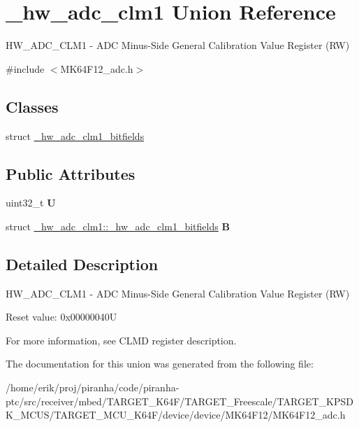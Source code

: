 \hypertarget{union__hw__adc__clm1}{}\section{\+\_\+hw\+\_\+adc\+\_\+clm1 Union Reference}
\label{union__hw__adc__clm1}


H\+W\+\_\+\+A\+D\+C\+\_\+\+C\+L\+M1 -\/ A\+DC Minus-\/\+Side General Calibration Value Register (RW)  




{\ttfamily \#include $<$M\+K64\+F12\+\_\+adc.\+h$>$}

\subsection*{Classes}
\begin{DoxyCompactItemize}
\item 
struct \hyperlink{struct__hw__adc__clm1_1_1__hw__adc__clm1__bitfields}{\+\_\+hw\+\_\+adc\+\_\+clm1\+\_\+bitfields}
\end{DoxyCompactItemize}
\subsection*{Public Attributes}
\begin{DoxyCompactItemize}
\item 
uint32\+\_\+t {\bfseries U}\hypertarget{union__hw__adc__clm1_a1d506e69ea77d5bb0afa2160c5084620}{}\label{union__hw__adc__clm1_a1d506e69ea77d5bb0afa2160c5084620}

\item 
struct \hyperlink{struct__hw__adc__clm1_1_1__hw__adc__clm1__bitfields}{\+\_\+hw\+\_\+adc\+\_\+clm1\+::\+\_\+hw\+\_\+adc\+\_\+clm1\+\_\+bitfields} {\bfseries B}\hypertarget{union__hw__adc__clm1_ac5bedd0f0b7ef50eb9bb3ea5e48672fb}{}\label{union__hw__adc__clm1_ac5bedd0f0b7ef50eb9bb3ea5e48672fb}

\end{DoxyCompactItemize}


\subsection{Detailed Description}
H\+W\+\_\+\+A\+D\+C\+\_\+\+C\+L\+M1 -\/ A\+DC Minus-\/\+Side General Calibration Value Register (RW) 

Reset value\+: 0x00000040U

For more information, see C\+L\+MD register description. 

The documentation for this union was generated from the following file\+:\begin{DoxyCompactItemize}
\item 
/home/erik/proj/piranha/code/piranha-\/ptc/src/receiver/mbed/\+T\+A\+R\+G\+E\+T\+\_\+\+K64\+F/\+T\+A\+R\+G\+E\+T\+\_\+\+Freescale/\+T\+A\+R\+G\+E\+T\+\_\+\+K\+P\+S\+D\+K\+\_\+\+M\+C\+U\+S/\+T\+A\+R\+G\+E\+T\+\_\+\+M\+C\+U\+\_\+\+K64\+F/device/device/\+M\+K64\+F12/M\+K64\+F12\+\_\+adc.\+h\end{DoxyCompactItemize}
